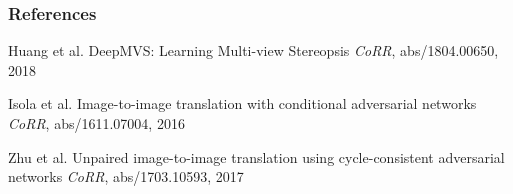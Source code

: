 \documentclass{beamer}
\begin{document}
\begin{frame}
\frametitle{References}
\footnotesize{
	\begin{thebibliography}{99} 
		 Huang et al.
		\newblock DeepMVS: Learning Multi-view Stereopsis
		\newblock \emph{CoRR}, abs/1804.00650, 2018
	\end{thebibliography}
	\begin{thebibliography}{99} 
		 Isola et al.
		\newblock Image-to-image translation with conditional adversarial networks
		\newblock \emph{CoRR}, abs/1611.07004, 2016
	\end{thebibliography}

	\begin{thebibliography}{99} 
		 Zhu et al.
		\newblock Unpaired image-to-image translation using cycle-consistent adversarial networks
		\newblock \emph{CoRR}, abs/1703.10593, 2017
	\end{thebibliography}
}
\end{frame}

\begin{frame}
\titlepage
\end{frame}

\end{document}
